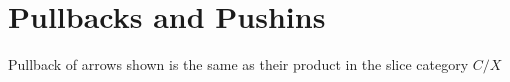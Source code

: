 \documentclass[../../notes.tex]{subfiles}
\begin{document}
\section{Pullbacks and Pushins}


Pullback of arrows shown is the same as their product in the slice category $C/X$
\end{document}
